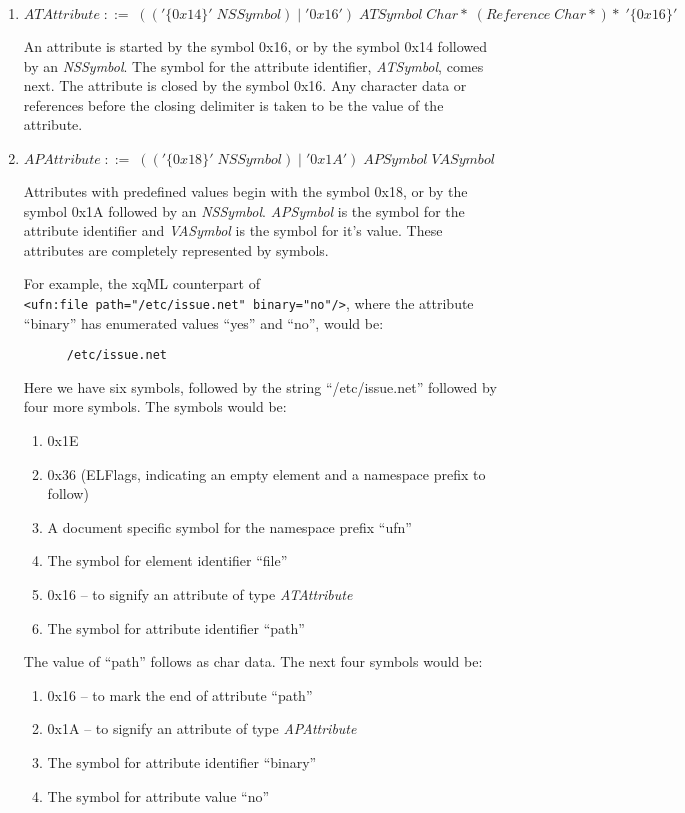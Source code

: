 \begin{enumerate}
\item \label{pr:ATAttribute} \(ATAttribute\;::=\;(('\{0x14\}'\;NSSymbol)\;|\;'{0x16}')\;ATSymbol\;Char*\;(Reference\;Char*)*\;'\{0x16\}' \)

An attribute is started by the symbol 0x16, or by the symbol 0x14
followed by an {\it NSSymbol}. The symbol for the attribute
identifier, {\it ATSymbol}, comes next. The attribute is closed by the
symbol 0x16. Any character data or references before the closing
delimiter is taken to be the value of the attribute.

\item \label{pr:APAttribute} \(APAttribute\;::=\;(('\{0x18\}'\;NSSymbol)\;|\;'{0x1A}')\;APSymbol\;VASymbol \)

Attributes with predefined values begin with the symbol 0x18, or by
the symbol 0x1A followed by an {\it NSSymbol}. \textit{APSymbol} is
the symbol for the attribute identifier and \textit{VASymbol} is the
symbol for it's value. These attributes are completely represented by
symbols.

For example, the xqML counterpart of \\
\verb|<ufn:file path="/etc/issue.net" binary="no"/>|, where the
attribute ``binary'' has enumerated values ``yes'' and ``no'',  would
be:
\begin{center} \verb*|      /etc/issue.net    | \end{center}
Here we have six symbols, followed by the string ``/etc/issue.net''
followed by four more symbols. The symbols would be:
\begin{enumerate}
\item 0x1E
\item 0x36 (ELFlags, indicating an empty element and a namespace
  prefix to follow)
\item A document specific symbol for the namespace prefix ``ufn''
\item The symbol for element identifier ``file''
\item 0x16 -- to signify an attribute of type \textit{ATAttribute}
\item The symbol for attribute identifier ``path''
\end{enumerate}
The value of ``path'' follows as char data. The next four symbols
would be:
\begin{enumerate}
\item 0x16 -- to mark the end of attribute ``path''
\item 0x1A -- to signify an attribute of type \textit{APAttribute}
\item The symbol for attribute identifier ``binary''
\item The symbol for attribute value ``no''
\end{enumerate}


\end{enumerate}
